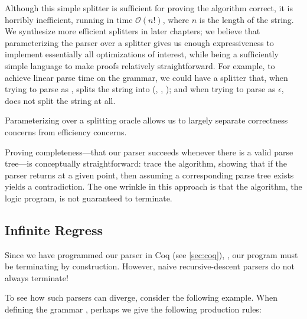   Although this simple splitter is sufficient for proving the algorithm correct, it is horribly inefficient, running in time $\mathcal O(n!)$, where $n$ is the length of the string.  We synthesize more efficient splitters in later chapters; we believe that parameterizing the parser over a splitter gives us enough expressiveness to implement essentially all optimizations of interest, while being a sufficiently simple language to make proofs relatively straightforward.  For example, to achieve linear parse time on the  grammar, we could have a splitter that, when trying to parse  as , splits the string into (, , ); and when trying to parse  as $\epsilon$, does not split the string at all.
  
  Parameterizing over a splitting oracle allows us to largely separate correctness concerns from efficiency concerns.



  Proving completeness---that our parser succeeds whenever there is a valid parse tree---is conceptually straightforward: trace the algorithm, showing that if the parser returns \false\space at a given point, then assuming a corresponding parse tree exists yields a contradiction.  The one wrinkle in this approach is that the algorithm, the logic program, is not guaranteed to terminate.

  \subsection{Infinite Regress} \label{sec:loopy-grammar-example}
    Since we have programmed our parser in Coq (see \autoref{sec:coq}), , our program must be terminating by construction.  However, naive recursive-descent parsers do not always terminate!

    To see how such parsers can diverge, consider the following example.  When defining the grammar , perhaps we give the following production rules:

